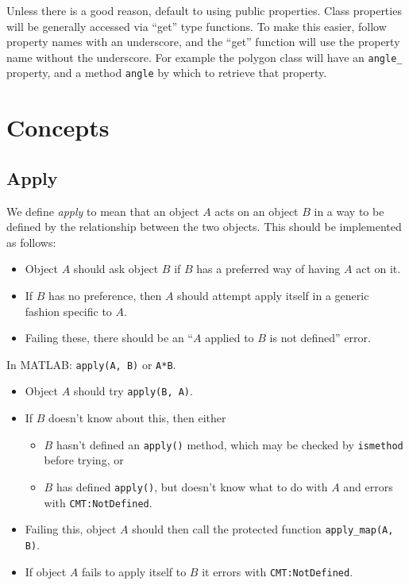 \documentclass{article}
\newcommand{\code}[1]{\texttt{#1}}
\newcommand{\matlab}{MATLAB}
\begin{document}
Unless there is a good reason, default to using public properties. Class properties will be generally accessed via ``get'' type functions. To make this easier, follow property names with an underscore, and the ``get'' function will use the property name without the underscore. For example the polygon class will have an \code{angle\_} property, and a method \code{angle} by which to retrieve that property.

\section{Concepts}
\subsection{Apply}
We define \emph{apply} to mean that an object $A$ acts on an object $B$ in a way to be defined by the relationship between the two objects. This should be implemented as follows:
\begin{itemize}
  \item Object $A$ should ask object $B$ if $B$ has a preferred way of having $A$ act on it.
  \item If $B$ has no preference, then $A$ should attempt apply itself in a generic fashion specific to $A$.
  \item Failing these, there should be an ``$A$ applied to $B$ is not defined'' error.
\end{itemize}

\noindent In \matlab: \code{apply(A, B)} or \code{A*B}.
\begin{itemize}
  \item Object $A$ should try \code{apply(B, A)}.
  \item If $B$ doesn't know about this, then either
    \begin{itemize}
      \item $B$ hasn't defined an \code{apply()} method, which may be checked by \code{ismethod} before trying, or
      \item $B$ has defined \code{apply()}, but doesn't know what to do with $A$ and errors with \code{CMT:NotDefined}.
    \end{itemize}
  \item Failing this, object $A$ should then call the protected function \code{apply\_map(A, B)}.
  \item If object $A$ fails to apply itself to $B$ it errors with \code{CMT:NotDefined}.
\end{itemize}
\end{document}
